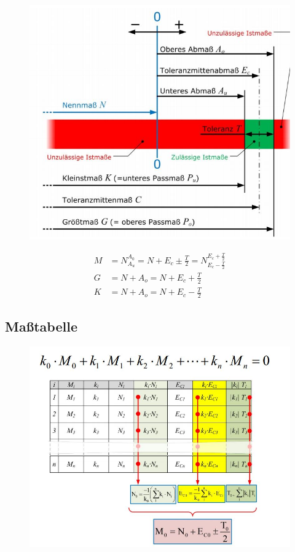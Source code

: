 \begin{figure}[h]
	\centering
	\includegraphics[scale=0.6]{Toleranzen_1.jpg}
\end{figure}

\begin{align*}
M &= N^{A_0}_{A_u} = N + E_c \pm \frac{T}{2} = N^{E_c + \frac{T}{2}}_{E_c - \frac{T}{2}} \\
G &= N + A_o = N + E_c + \frac{T}{2} \\
K &= N + A_o = N + E_c - \frac{T}{2}
\end{align*}

\newpage

\subsection*{Maßtabelle}

\begin{figure}[h]
	\centering
	\includegraphics[scale=0.7]{Masstabelle.jpg}
\end{figure}








